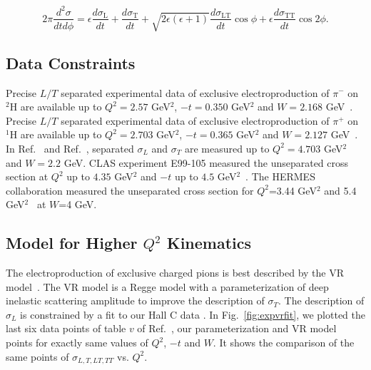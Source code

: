 \begin{equation}
  2\pi \frac{d^2 \sigma}{dt d\phi} = \epsilon \frac{d\sigma_{\mathrm{L}}}{dt} +
  \frac{d\sigma_{\mathrm{T}}}{dt} + \sqrt{2\epsilon (\epsilon +1)}
  \frac{d\sigma_{\mathrm{LT}}}{dt} \cos{\phi} + \epsilon
  \frac{d\sigma_{\mathrm{TT}}}{dt} \cos{2 \phi}.
  \label{equation:cross-3}
\end{equation}

\subsection{Data Constraints}

Precise $L/T$ separated experimental data of exclusive electroproduction of
$\pi^{-}$ on $^2$H are available up to $Q^2=2.57$ GeV$^2$, $-t=0.350$
GeV$^2$ and $W=2.168$ GeV~\cite{gmhuber-2}. Precise $L/T$ separated
experimental data of exclusive electroproduction of $\pi^{+}$ on $^1$H are
available up to $Q^2=2.703$ GeV$^2$, $-t=0.365$ GeV$^2$ and $W=2.127$
GeV~\cite{Fpi2}. In Ref.~\cite{hallc-1} and Ref.~\cite{hallc-2}, separated
$\sigma_{L}$ and $\sigma_{T}$ are measured up to $Q^2=4.703$ GeV$^2$ and
$W=2.2$ GeV. CLAS experiment E99-105 measured the unseparated cross section at
$Q^2$ up to $4.35$ GeV$^2$ and $-t$ up to $4.5$ GeV$^2$~\cite{park}.  The
HERMES collaboration measured the unseparated cross section for $Q^2$=3.44
GeV$^2$ and 5.4 GeV$^2$~\cite{hermes} at $W$=4 GeV.

\subsection{Model for Higher $Q^2$ Kinematics}

The electroproduction of exclusive charged pions is best described by the VR
model~\cite{vr}. The VR model is a Regge model with a parameterization of deep
inelastic scattering amplitude to improve the description of $\sigma_{T}$. The
description of $\sigma_{L}$ is constrained by a fit to our Hall C data 
\cite{Fpi2}. In Fig.~\ref{fig:expvrfit}, we plotted the last six data
points of table $v$ of Ref.~\cite{gmhuber-2}, our parameterization and VR model
points for exactly same values of $Q^2$, $-t$ and $W$. It shows the comparison
of the same points of $\sigma_{L,T,LT,TT}$ vs. $Q^{2}$.

